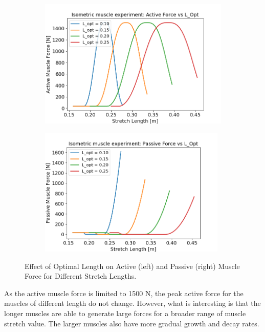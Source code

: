 \documentclass{cmc}
\begin{document}
\begin{figure}[H]
    \centering
    \begin{subfigure}{.48\textwidth}
        \centering
          \includegraphics[width=\textwidth,trim={0.0cm 0.0cm 1.0cm 0.0cm},clip]{1c/1c_active.png}
    \end{subfigure}    
    \begin{subfigure}{.48\textwidth}
        \centering
          \includegraphics[width=0.98\textwidth,trim={0.0cm 0.0cm 1.0cm 0.0cm},clip]{1c/1c_passive.png}
    \end{subfigure}
    \caption{Effect of Optimal Length on Active (left) and Passive (right) Muscle Force for Different Stretch Lengths.}
    \label{fig:loptForce}
\end{figure}

As the active muscle force is limited to 1500 N, the peak active force for the muscles of different length do not change. However, what is interesting is that the longer muscles are able to generate large forces for a broader range of muscle stretch value. The larger muscles also have more gradual growth and decay rates.\\ 
\end{document}

